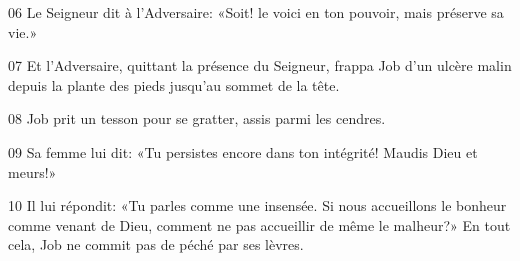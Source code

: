 
06 Le Seigneur dit à l’Adversaire: «Soit! le voici en ton pouvoir, mais préserve sa vie.»

07 Et l’Adversaire, quittant la présence du Seigneur, frappa Job d’un ulcère malin depuis la plante des pieds jusqu’au sommet de la tête.

08 Job prit un tesson pour se gratter, assis parmi les cendres.

09 Sa femme lui dit: «Tu persistes encore dans ton intégrité! Maudis Dieu et meurs!»

10 Il lui répondit: «Tu parles comme une insensée. Si nous accueillons le bonheur comme venant de Dieu, comment ne pas accueillir de même le malheur?» En tout cela, Job ne commit pas de péché par ses lèvres.
